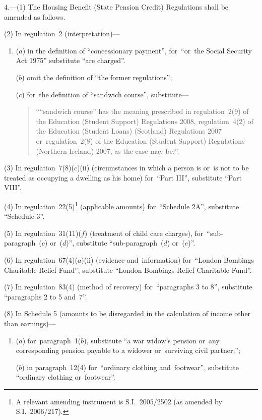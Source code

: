 \documentclass[12pt,a4paper]{article}
\begin{document}
4.---(1)  The Housing Benefit (State Pension Credit) Regulations shall be amended as follows.

(2) In regulation~2 (interpretation)—
\begin{enumerate}\item[]
($a$) in the definition of “concessionary payment”, for~“or~the Social Security Act 1975” substitute “are charged”.

($b$) omit the definition of “the former regulations”;

($c$) for~the definition of “sandwich course”, substitute—
\begin{quotation}
““sandwich course” has the meaning prescribed in regulation~2(9) of the Education (Student Support) Regulations 2008, regulation~4(2) of the Education (Student Loans) (Scotland) Regulations 2007 or~regulation~2(8) of the Education (Student Support) Regulations (Northern Ireland) 2007, as the case may be;”.
\end{quotation}
\end{enumerate}

(3) In regulation~7(8)($c$)(ii)  (circumstances in which a person is or~is not to be treated as occupying a dwelling as his home) for~“Part III”, substitute “Part VIII”.

(4) In regulation~22(5)\footnote{A relevant amending instrument is S.I.~2005/2502 (as amended by S.I.~2006/217).} (applicable amounts) for~“Schedule 2A”, substitute “Schedule 3”.

(5) In regulation~31(11)($f$)  (treatment of child care charges), for~“sub-paragraph~($c$)  or~($d$)”, substitute “sub-paragraph~($d$)  or~($e$)”.

(6) In regulation~67(4)($a$)(ii)  (evidence and~information) for~“London Bombings Charitable Relief Fund”, substitute “London Bombings Relief Charitable Fund”.

(7) In regulation~83(4) (method of recovery) for~“paragraphs 3 to 8”, substitute “paragraphs 2 to 5 and~7”.

(8) In Schedule 5 (amounts to be disregarded in the calculation of income other than earnings)—
\begin{enumerate}\item[]
($a$) for~paragraph~1($b$), substitute “a war widow’s pension or~any corresponding pension payable to a widower or~surviving civil partner;”;

($b$) in paragraph~12(4) for~“ordinary clothing and~footwear”, substitute “ordinary clothing or~footwear”.
\end{enumerate}
\end{document}
